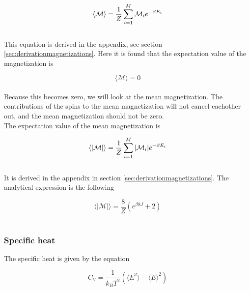 \documentclass{article}
\begin{document}
\begin{equation}    \label{eq:magnetization}
    \langle \mathcal{M} \rangle = \frac{1}{Z} \sum _{i=1} ^M \mathcal{M}_i e^{- \beta E_i} \\
\end{equation} \\

This equation is derived in the appendix, see section \ref{sec:derivationmagnetizations}. Here it is found that the expectation value of the magnetization is

\begin{equation} \label{eq:finalmagnetization}
    \langle \mathcal{M} \rangle = 0
\end{equation} \\

Because this becomes zero, we will look at the mean magnetization. The contributions of the spins to the mean magnetization will not cancel eachother out, and the mean magnetization should not be zero. \\

The expectation value of the mean magnetization is

\begin{equation}    \label{eq:meanmagnetization}
    \langle |\mathcal{M}| \rangle = \frac{1}{Z} \sum _{i=1} ^M |\mathcal{M}_i| e^{- \beta E_i} \\
\end{equation} \\

It is derived in the appendix in section \ref{sec:derivationmagnetizations}. The analytical expression is the following

\begin{equation} \label{eq:finalmeanmagnetization}
    \langle | \mathcal{M} | \rangle = \frac{8}{Z} \left( e^{\beta 8J} + 2 \right)
\end{equation} \\


\subsubsection{Specific heat} \label{sec:specificheat}

The specific heat is given by the equation

\begin{equation}    \label{eq:specificheat}
    C_V = \frac{1}{k_B T^2} \left( \langle E^2 \rangle - \langle E \rangle ^2 \right)
\end{equation} \\
\end{document}
